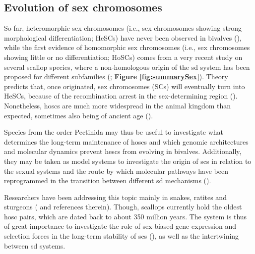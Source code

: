 \documentclass[../main.tex]{subfiles}
\begin{document}
\subsection{Evolution of sex chromosomes}
So far, heteromorphic sex chromosomes (i.e., sex chromosomes showing strong morphological differentiation; HeSCs) have never been observed in bivalves (\textbf{\cite{breton2018sex}}), while the first evidence of homomorphic sex chromosomes (i.e., sex chromosomes showing little or no differentiation; HoSCs) comes from a very recent study on several scallop species, where a non-homologous origin of the \gls{sd} system has been proposed for different subfamilies (\textbf{\cite{han2022ancient}}; \textbf{Figure \ref{fig:summarySex}}). Theory predicts that, once originated, sex chromosomes (SCs) will eventually turn into HeSCs, because of the recombination arrest in the sex-determining region (\textbf{\cite{bachtrog2014sex, beukeboom2014evolution, han2022ancient}}). Nonetheless, \glspl{hosc} are much more widespread in the animal kingdom than expected, sometimes also being of ancient age (\textbf{\cite{bachtrog2014sex, han2022ancient}}).

Species from the order Pectinida may thus be useful to investigate what determines the long-term maintenance of \glspl{hosc} and which genomic architectures and molecular dynamics prevent \glspl{hesc} from evolving in bivalves. Additionally, they may be taken as model systems to investigate the origin of \glspl{sc} in relation to the sexual systems and the route by which molecular pathways have been reprogrammed in the transition between different \gls{sd} mechanisms (\textbf{\cite{han2022ancient}}).

Researchers have been addressing this topic mainly in snakes, ratites and sturgeons (\textbf{\cite{bachtrog2014sex, han2022ancient}} and references therein). Though, scallops currently hold the oldest \gls{hosc} pairs, which are dated back to about 350 million years. The system is thus of great importance to investigate the role of sex-biased gene expression and selection forces in the long-term stability of \glspl{sc} (\textbf{\cite{han2022ancient}}), as well as the intertwining between \gls{sd} systems.
\end{document}
